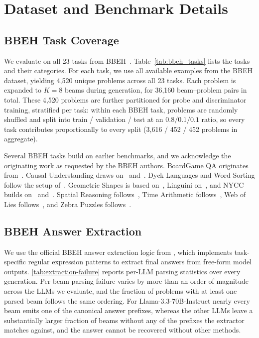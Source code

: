 \section{Dataset and Benchmark Details}
\label{appendix:dataset}

\subsection{BBEH Task Coverage}
We evaluate on all 23 tasks from BBEH~\citep{kazemi2025bigbenchextrahard}.
Table~\ref{tab:bbeh_tasks} lists the tasks and their categories.
For each task, we use all available examples from the BBEH dataset,
yielding 4{,}520 unique problems across all 23 tasks.
Each problem is expanded to $K=8$ beams during generation, for 36{,}160 beam--problem
pairs in total.
These 4{,}520 problems are further partitioned for probe and discriminator training,
stratified per task: within each BBEH task, problems are randomly shuffled and split
into train / validation / test at an $0.8 / 0.1 / 0.1$ ratio, so every task
contributes proportionally to every split (3{,}616 / 452 / 452 problems in aggregate).



Several BBEH tasks build on earlier benchmarks, and we acknowledge the
originating work as requested by the BBEH authors.
BoardGame QA originates from~\citet{kazemi2024boardgameqa}.
Causal Understanding draws on~\citet{nie2024moca} and~\citet{kiciman2023causal}.
Dyck Languages and Word Sorting follow the setup
of~\citet{tyen2023llms}.
Geometric Shapes is based on~\citet{kazemi2023geomverse},
Linguini on~\citet{sanchez2024linguini},
and NYCC builds on~\citet{hessel2022androids}
and~\citet{zhang2024humor}.
Spatial Reasoning follows~\citet{yamada2023evaluating},
Time Arithmetic follows~\citet{fatemi2024test},
Web of Lies follows~\citet{white2024livebench},
and Zebra Puzzles follows~\citet{shah2024causal}.

\subsection{BBEH Answer Extraction}
We use the official BBEH answer extraction logic from
\citet{kazemi2025bigbenchextrahard}, which implements task-specific
regular expression patterns to extract final answers from free-form
model outputs.
\cref{tab:extraction-failure} reports per-LLM parsing statistics over
every generation. Per-beam parsing failure varies by more than an order
of magnitude across the LLMs we evaluate, and the fraction of problems
with at least one parsed beam follows the same ordering. For
Llama-3.3-70B-Instruct nearly every beam emits one of the canonical
answer prefixes, whereas the other LLMs leave a substantially larger
fraction of beams without any of the prefixes the extractor matches
against, and the answer cannot be recovered without other methods.

